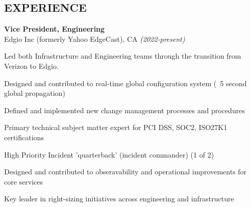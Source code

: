 \documentclass[margin]{res}
\begin{document}
\begin{resume}
\section{EXPERIENCE}
\noindent

{\bf Vice President, Engineering}\\
Edgio Inc (formerly Yahoo EdgeCast), CA {\em (2022-present)}
\begin{list}{}{\leftmargin=1.5em \topsep=5pt \partopsep=0pt \parsep=2.5pt}
  \item Led both Infrastructure and Engineering teams through the transition from Verizon to Edgio.
  \item Designed and contributed to real-time global configuration system (~5 second global propagation)
  \item Defined and implemented new change management processes and procedures
  \item Primary technical subject matter expert for PCI DSS, SOC2, ISO27K1 certifications
  \item High Priority Incident 'quarterback' (incident commander) (1 of 2)
  \item Designed and contributed to obseravability and operational improvements for core services
  \item Key leader in right-sizing initiatives across engineering and infrastructure
\end{list}


\end{resume}
\end{document}
